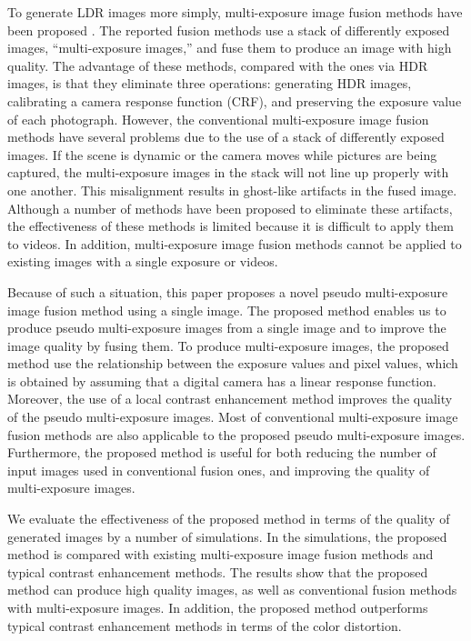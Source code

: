 \documentclass[paper]{ieice}
\begin{document}
  To generate LDR images more simply, multi-exposure image fusion methods have been proposed
  \cite{goshtasby2005fusion,mertens2009exposure,saleem2012image,wang2015exposure,
  li2014selectively,sakai2015hybrid,nejati2017fast}.
  The reported fusion methods use a stack of differently exposed images,
  ``multi-exposure images,'' and fuse them to produce an image with high quality.
  The advantage of these methods, compared with the ones via HDR images, is that
  they eliminate three operations:
  generating HDR images, calibrating a camera response function (CRF),
  and preserving the exposure value of each photograph.
  However, the conventional multi-exposure image fusion methods have several problems
  due to the use of a stack of differently exposed images.
  If the scene is dynamic or the camera moves while pictures are
  being captured, the multi-exposure images in the stack will not line up properly
  with one another.
  This misalignment results in ghost-like artifacts in the fused image.
  Although a number of methods have been proposed\cite{li2014selectively,oh2015robust}
  to eliminate these artifacts,
  the effectiveness of these methods is limited because
  it is difficult to apply them to videos.
  In addition, multi-exposure image fusion methods
  cannot be applied to existing images with a single exposure or videos.
  
  Because of such a situation, this paper proposes a novel pseudo multi-exposure image
  fusion method using a single image.
  The proposed method enables us to produce pseudo multi-exposure images from a
  single image and to improve the image quality by fusing them.
  To produce multi-exposure images, the proposed method
  use the relationship between the exposure values and pixel values,
  which is obtained by assuming that a digital camera has a
  linear response function.
  Moreover, the use of a local contrast enhancement method improves the quality of
  the pseudo multi-exposure images.
  Most of conventional multi-exposure image fusion methods are also applicable to
  the proposed pseudo multi-exposure images.
  Furthermore, the proposed method is useful for both reducing
  the number of input images used in conventional fusion ones,
  and improving the quality of multi-exposure images.
  
  We evaluate the effectiveness of the proposed method in terms of the
  quality of generated images by a number of simulations.
  In the simulations, the proposed method is compared with existing
  multi-exposure image fusion methods and typical contrast enhancement methods.
  The results show that the proposed method can produce high quality images,
  as well as conventional fusion methods with multi-exposure images.
  In addition, the proposed method outperforms typical contrast enhancement methods
  in terms of the color distortion.
%
\end{document}
